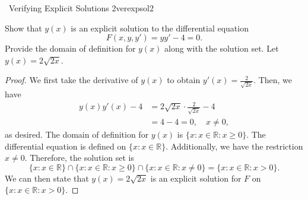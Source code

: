         \begin{example}{\Difficulty\,\Difficulty\,\,Verifying Explicit Solutions 2}{verexpsol2}
        
            Show that \(y(x)\) is an explicit solution to the differential equation
            \begin{equation*}
                F(x,y,y')=yy'-4=0.
            \end{equation*}
            Provide the domain of definition for \(y(x)\) along with the solution set. Let \(y(x)=2\sqrt{2x}\).
            \begin{proof}
                We first take the derivative of \(y(x)\) to obtain \(y'(x)=\frac{2}{\sqrt{2x}}\). Then, we have
                \begin{align*}
                    y(x)y'(x)-4&=2\sqrt{2x}\cdot\frac{2}{\sqrt{2x}}-4 \\
                    &=4-4=0,\quad x\neq0,
                \end{align*}
                as desired. The domain of definition for \(y(x)\) is \(\{x:x\in\mathbb{R}:x\geq0\}\). The differential equation is defined on \(\{x:x\in\mathbb{R}\}\). Additionally, we have the restriction \(x\neq 0\). Therefore, the solution set is 
                \begin{equation*}
                    \{x:x\in\mathbb{R}\}\cap\{x:x\in\mathbb{R}:x\geq0\}\cap\{x:x\in\mathbb{R}:x\neq0\}=\{x:x\in\mathbb{R}:x>0\}.
                \end{equation*}
                We can then state that \(y(x)=2\sqrt{2x}\) is an explicit solution for \(F\) on \(\{x:x\in\mathbb{R}:x>0\}\).
            \end{proof}
            
        \end{example}
